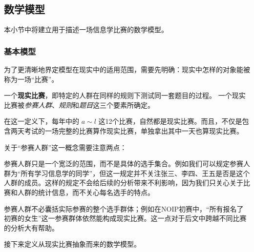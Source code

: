     \subsection{数学模型}

        本小节中将建立用于描述一场信息学比赛的数学模型。

        \subsubsection{基本模型}
        
            为了更清晰地界定模型在现实中的适用范围，需要先明确：现实中怎样的对象能被称为一场“比赛”。

            \begin{definition}[现实比赛]
                一个\textbf{现实比赛}，即特定的人群在同样的规则下测试同一套题目的过程。
                一个现实比赛被\emph{参赛人群}、\emph{规则}和\emph{题目}这三个要素所确定。
                \label{def:realContest}
            \end{definition}

            在这一定义下，每年中的 $a\sim l$ 这12个比赛，自然都是现实比赛。而且，不仅是包含两天考试的一场完整的比赛算作现实比赛，单独拿出其中一天也算现实比赛。
            
            \vspace{1.5ex}

            关于“参赛人群”这一概念需要注意两点：
            
            \begin{asparaitem}
                \item 参赛人群只是一个宽泛的范围，而不是具体的选手集合。例如我们可以规定参赛人群为“所有学习信息学的同学”，但这一规定并不关注张三、李四、王五是否是这个人群的成员。这样的规定不会给后续的分析带来不利影响，因为我们只关心关于比赛和人群的统计信息，而不关心每名选手的特点。
                \item 参赛人群不必囊括实际参赛的整个选手群体；例如在NOIP初赛中，“所有报名了初赛的女生”这一参赛群体依然能构成现实比赛。这一点对于后文中跨越不同比赛的分析大有帮助。
            \end{asparaitem}
            
            \vspace{1.5ex}

            接下来定义从现实比赛抽象而来的数学模型。

